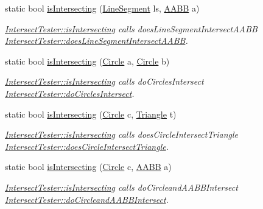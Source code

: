 \begin{DoxyCompactItemize}
static bool \hyperlink{class_intersect_tester_a6caf298c7e2e46a9b00f68ce9554a5eb}{is\+Intersecting} (\hyperlink{class_line_segment}{Line\+Segment} ls, \hyperlink{class_a_a_b_b}{A\+A\+BB} a)
\begin{DoxyCompactList}\small\item\em \hyperlink{class_intersect_tester_a7710e17ff7d2e229059f23b9429213f5}{Intersect\+Tester\+::is\+Intersecting} calls does\+Line\+Segment\+Intersect\+A\+A\+BB  \hyperlink{class_intersect_tester_a817105ec3f73e20066121d7d9d85a3ae}{Intersect\+Tester\+::does\+Line\+Segment\+Intersect\+A\+A\+BB}. \end{DoxyCompactList}\item 
static bool \hyperlink{class_intersect_tester_a3f908e959ef38b2591582b8796ed2efd}{is\+Intersecting} (\hyperlink{class_circle}{Circle} a, \hyperlink{class_circle}{Circle} b)
\begin{DoxyCompactList}\small\item\em \hyperlink{class_intersect_tester_a7710e17ff7d2e229059f23b9429213f5}{Intersect\+Tester\+::is\+Intersecting} calls do\+Circles\+Intersect  \hyperlink{class_intersect_tester_a5ce26d69bdb46983fb96516c8a8e1b55}{Intersect\+Tester\+::do\+Circles\+Intersect}. \end{DoxyCompactList}\item 
static bool \hyperlink{class_intersect_tester_a76f351cdf60b75daf6a4a1e7240c1f3d}{is\+Intersecting} (\hyperlink{class_circle}{Circle} c, \hyperlink{class_triangle}{Triangle} t)
\begin{DoxyCompactList}\small\item\em \hyperlink{class_intersect_tester_a7710e17ff7d2e229059f23b9429213f5}{Intersect\+Tester\+::is\+Intersecting} calls does\+Circle\+Intersect\+Triangle  \hyperlink{class_intersect_tester_a4a2f8f6f66be1f1d432c3e04e919273f}{Intersect\+Tester\+::does\+Circle\+Intersect\+Triangle}. \end{DoxyCompactList}\item 
static bool \hyperlink{class_intersect_tester_afe557ee5f9e2da763c430cbbad44162e}{is\+Intersecting} (\hyperlink{class_circle}{Circle} c, \hyperlink{class_a_a_b_b}{A\+A\+BB} a)
\begin{DoxyCompactList}\small\item\em \hyperlink{class_intersect_tester_a7710e17ff7d2e229059f23b9429213f5}{Intersect\+Tester\+::is\+Intersecting} calls do\+Circleand\+A\+A\+B\+B\+Intersect  \hyperlink{class_intersect_tester_af76b72861b57c630e7c54ad9449a2d27}{Intersect\+Tester\+::do\+Circleand\+A\+A\+B\+B\+Intersect}. \end{DoxyCompactList}\item 

\end{DoxyCompactItemize}
